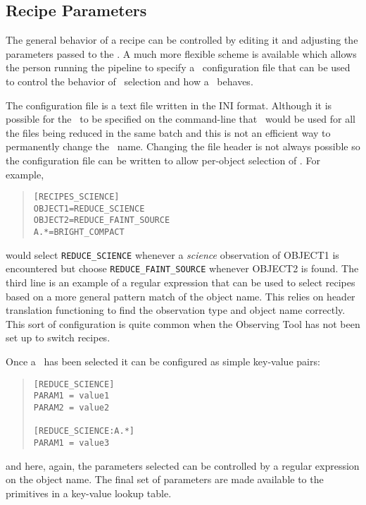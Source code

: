 \documentclass[final,authoryear,5p,times,twocolumn]{elsarticle}
\begin{document}
\subsection{Recipe Parameters}

The general behavior of a recipe can be controlled by editing it and
adjusting the parameters passed to the \primitives. A much more
flexible scheme is available which allows the person running the
pipeline to specify a \recipe\ configuration file that can be used to
control the behavior of \recipe\ selection and how a \recipe\ behaves.

The configuration file is a text file written in the INI
format. Although it is possible for the \recipe\ to be specified on
the command-line that \recipe\ would be used for all the files being
reduced in the same batch and this is not an efficient way to
permanently change the \recipe\ name. Changing the file header is not
always possible so the configuration file can be written to allow
per-object selection of \recipes. For example,

\begin{quote}
\begin{verbatim}
[RECIPES_SCIENCE]
OBJECT1=REDUCE_SCIENCE
OBJECT2=REDUCE_FAINT_SOURCE
A.*=BRIGHT_COMPACT
\end{verbatim}
\end{quote}

would select \texttt{REDUCE\_SCIENCE} whenever a \emph{science}
observation of OBJECT1 is encountered but choose
\texttt{REDUCE\_FAINT\_SOURCE} whenever OBJECT2 is found. The third
line is an example of a regular expression that can be used to select
recipes based on a more general pattern match of the object name. This relies
on header translation functioning to find the observation type and
object name correctly. This sort of configuration is quite common when the
Observing Tool has not been set up to switch recipes.

Once a \recipe\ has been selected it can be configured as simple
key-value pairs:

\begin{quote}
\begin{verbatim}
[REDUCE_SCIENCE]
PARAM1 = value1
PARAM2 = value2

[REDUCE_SCIENCE:A.*]
PARAM1 = value3
\end{verbatim}
\end{quote}

and here, again, the parameters selected can be controlled by a
regular expression on the object name. The final set of parameters are
made available to the primitives in a key-value lookup table.
\end{document}
